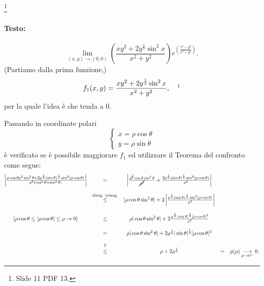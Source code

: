 \begin{example}\footnote{Slide 11 PDF 13.}
	\paragraph{Testo:}
	\begin{equation*}
		\lim\limits_{(x,y)\rightarrow(0,0)}\left(\frac{xy^2+2y^{\frac{1}{3}}\sin^2x}{x^2+y^2}\right)e^{\left(\frac{x^2-y^2}{x^2+y^2}\right)}.
	\end{equation*}
	(Partiamo dalla prima funzione,)
	\begin{equation*}
		f_1(x,y) = \frac{xy^2+2y^{\frac{1}{3}}\sin^2x}{x^2+y^2},\quad \footnotemark
	\end{equation*}
	per la quale l'idea è che tenda a 0. 
	
	\noindent Passando in coordinate polari
	\begin{equation*}
		\begin{cases}
			x = \rho \cos\theta\\
			y = \rho \sin\theta
		\end{cases}
	\end{equation*}
	è verificato se è possibile maggiorare $f_1$ ed utilizzare il Teorema del confronto come segue:
	\begin{equation*}
		\begin{matrix}
			\left|\frac{\rho\cos\theta\rho^2\sin^2\theta + 2\rho^{\frac{1}{3}}(\sin\theta)^{\frac{1}{3}}\sin^2(\rho\cos\theta)}{\rho^2(\cos^2\theta+\sin^2\theta)}\right| &=& \left|\frac{\rho^{\cancel 3}\cos\theta\sin^2\theta}{\cancel{\rho^2}} + \frac{ 2\rho^{\frac{1}{3}}(\sin\theta)^{\frac{1}{3}}\sin^2(\rho\cos\theta)}{\rho^2}\right|\\\\
			&\overset{\text{disug. triang.}}{\leq}& |\rho \cos\theta\sin^2\theta| + 2 \left| \frac{ \rho^{\frac{1}{3}}(\sin\theta)^{\frac{1}{3}}\sin^2(\rho\cos\theta)}{\rho^2}\right|\\\\
			[\rho\cos\theta\leq|\rho\cos\theta|\leq\rho\rightarrow 0] &\leq& \rho |\cos\theta\sin^2\theta| + 2  \frac{ \rho^{\frac{1}{3}} |\sin\theta|^{\frac{1}{3}}|\rho\cos\theta|^2}{\rho^2}\\\\
			&=&  \rho |\cos\theta\sin^2\theta| + 2 \rho^{\frac{1}{3}} |\sin\theta|^{\frac{1}{3}}|\rho\cos\theta|^2\\\\
			&\overset{\footnotemark}{\leq}& \rho + 2\rho^{\frac{1}{3}} &=& g(\rho) \underset{\rho\rightarrow 0^+}{\longrightarrow} 0.
		\end{matrix}
	\end{equation*}
	

\end{example}
